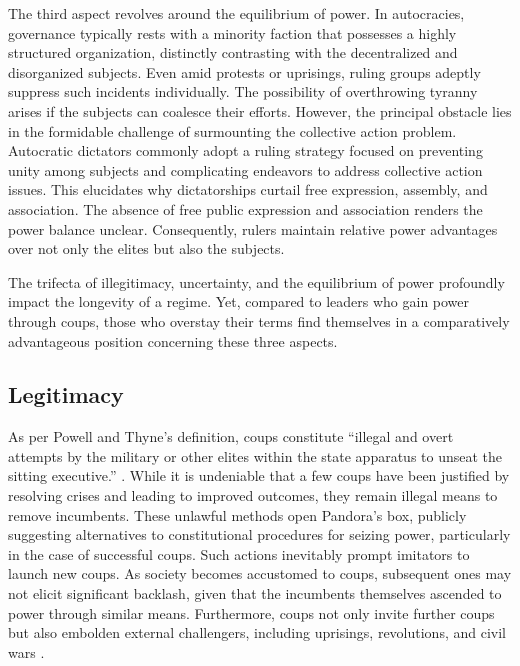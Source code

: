\documentclass[
  12pt,
  a4paper,
  12pt]{article}
\begin{document}
The third aspect revolves around the equilibrium of power. In
autocracies, governance typically rests with a minority faction that
possesses a highly structured organization, distinctly contrasting with
the decentralized and disorganized subjects. Even amid protests or
uprisings, ruling groups adeptly suppress such incidents individually.
The possibility of overthrowing tyranny arises if the subjects can
coalesce their efforts. However, the principal obstacle lies in the
formidable challenge of surmounting the collective action problem.
Autocratic dictators commonly adopt a ruling strategy focused on
preventing unity among subjects and complicating endeavors to address
collective action issues. This elucidates why dictatorships curtail free
expression, assembly, and association. The absence of free public
expression and association renders the power balance unclear.
Consequently, rulers maintain relative power advantages over not only
the elites but also the subjects.

The trifecta of illegitimacy, uncertainty, and the equilibrium of power
profoundly impact the longevity of a regime. Yet, compared to leaders
who gain power through coups, those who overstay their terms find
themselves in a comparatively advantageous position concerning these
three aspects.

\hypertarget{legitimacy}{%
\subsection{Legitimacy}\label{legitimacy}}

As per Powell and Thyne's definition, coups constitute ``illegal and
overt attempts by the military or other elites within the state
apparatus to unseat the sitting executive.'' \citep[p.252]{powell2011}.
While it is undeniable that a few coups have been justified by resolving
crises and leading to improved outcomes, they remain illegal means to
remove incumbents. These unlawful methods open Pandora's box, publicly
suggesting alternatives to constitutional procedures for seizing power,
particularly in the case of successful coups. Such actions inevitably
prompt imitators to launch new coups. As society becomes accustomed to
coups, subsequent ones may not elicit significant backlash, given that
the incumbents themselves ascended to power through similar means.
Furthermore, coups not only invite further coups but also embolden
external challengers, including uprisings, revolutions, and civil wars
\citep{dahl2023}.
\end{document}
